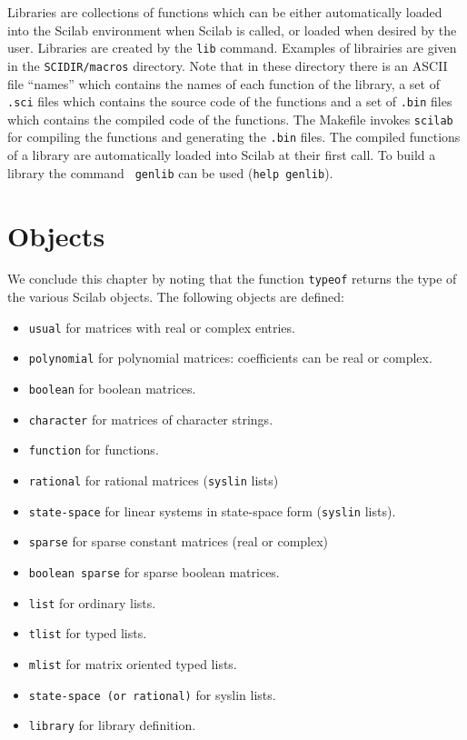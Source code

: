 	Libraries are collections of functions which can be either 
automatically loaded into the Scilab environment when
Scilab is called, or loaded when desired by the user.  
Libraries are created by the {\tt lib} command. Examples of librairies
are given in the {\tt SCIDIR/macros} directory. Note that in these
directory there is an ASCII file ``names'' which contains the names
of each function of the library, a set of {\tt .sci} files which
contains the source code of the functions and a set of {\tt .bin} files
which contains the compiled code of the functions. The Makefile invokes
{\tt scilab} for compiling the functions and generating the {\tt .bin}
files. The compiled functions of a library are automatically loaded 
into Scilab at their first call. To build a library the command {\tt
genlib} can be used (\verb!help genlib!).

\section{Objects}
We conclude this chapter by noting that the function {\tt typeof}
returns the type of the various Scilab objects. The following objects
are defined:
\begin{itemize}
\item{\tt usual} 	for matrices with real or complex entries.
\item{\tt polynomial} 	for polynomial matrices: coefficients can be 
real or complex.
\item{\tt boolean} 	for boolean matrices.
\item{\tt character} 	for matrices of character strings.
\item{\tt function} 	for functions.
\item{\tt rational} 	for rational matrices ({\tt syslin} lists)
\item{\tt state-space} 	for linear systems in state-space 
form ({\tt syslin} lists).
\item{\tt sparse} 	for sparse constant matrices (real or complex)
\item{\tt boolean sparse} for sparse boolean matrices.
\item{\tt list} 	for ordinary lists.
\item{\tt tlist}        for typed lists.
\item{\tt mlist}        for matrix oriented typed lists.
\item{\tt state-space (or rational)} for syslin lists.
\item{\tt library} 	for library definition.
\end{itemize}


